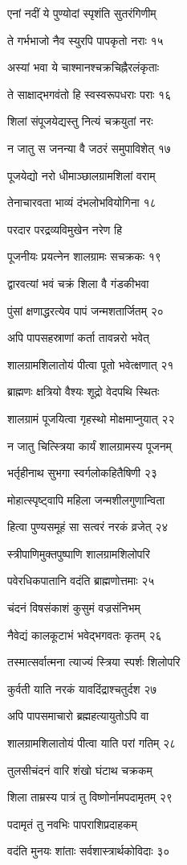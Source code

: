 एनां नदीं ये पुण्योदां स्पृशंति सुतरंगिणीम्

ते गर्भभाजो नैव स्युरपि पापकृतो नराः १५

अस्यां भवा ये चाश्मानश्चक्रचिह्नैरलंकृताः

ते साक्षाद्भगवंतो हि स्वस्वरूपधराः पराः १६

शिलां संपूजयेद्यस्तु नित्यं चक्रयुतां नरः

न जातु स जनन्या वै जठरं समुपाविशेत् १७

पूजयेद्यो नरो धीमाञ्छालग्रामशिलां वराम्

तेनाचारवता भाव्यं दंभलोभवियोगिना १८

परदार परद्रव्यविमुखेन नरेण हि

पूजनीयः प्रयत्नेन शालग्रामः सचक्रकः १९

द्वारवत्यां भवं चक्रं शिला वै गंडकीभवा

पुंसां क्षणाद्धरत्येव पापं जन्मशतार्जितम् २०

अपि पापसहस्राणां कर्ता तावन्नरो भवेत्

शालग्रामशिलातोयं पीत्वा पूतो भवेत्क्षणात् २१

ब्राह्मणः क्षत्रियो वैश्यः शूद्रो वेदपथि स्थितः

शालग्रामं पूजयित्वा गृहस्थो मोक्षमाप्नुयात् २२

न जातु चित्स्त्रिया कार्यं शालग्रामस्य पूजनम्

भर्तृहीनाथ सुभगा स्वर्गलोकहितैषिणी २३

मोहात्स्पृष्ट्वापि महिला जन्मशीलगुणान्विता

हित्वा पुण्यसमूहं सा सत्वरं नरकं व्रजेत् २४

स्त्रीपाणिमुक्तपुष्पाणि शालग्रामशिलोपरि

पवेरधिकपातानि वदंति ब्राह्मणोत्तमाः २५

चंदनं विषसंकाशं कुसुमं वज्रसंनिभम्

नैवेद्यं कालकूटाभं भवेद्भगवतः कृतम् २६

तस्मात्सर्वात्मना त्याज्यं स्त्रिया स्पर्शः शिलोपरि

कुर्वती याति नरकं यावदिंद्राश्चतुर्दश २७

अपि पापसमाचारो ब्रह्महत्यायुतोऽपि वा

शालग्रामशिलातोयं पीत्वा याति परां गतिम् २८

तुलसीचंदनं वारि शंखो घंटाथ चक्रकम्

शिला ताम्रस्य पात्रं तु विष्णोर्नामपदामृतम् २९

पदामृतं तु नवभिः पापराशिप्रदाहकम्

वदंति मुनयः शांताः सर्वशास्त्रार्थकोविदाः ३०

